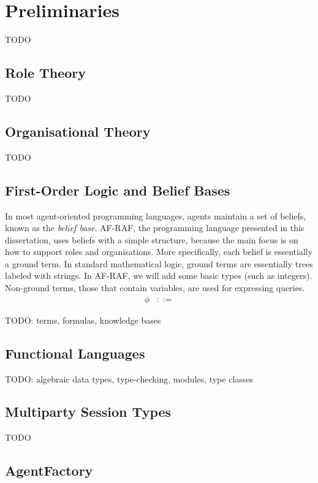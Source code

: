 \documentclass[a4paper,12pt,oneside]{book} %
\theoremstyle{remark}
\theoremstyle{plain}
\begin{document}
\chapter{Preliminaries} %

TODO

\section{Role Theory} %

TODO

\section{Organisational Theory}  %

TODO

\section{First-Order Logic and Belief Bases} %

In most agent-oriented programming languages, agents maintain a set of
beliefs, known as the \emph{belief base}.  AF-RAF, the programming language
presented in this dissertation, uses beliefs with a simple structure,
because the main focus is on how to support roles and organisations.  More
specifically, each belief is essentially a ground term.  In standard
mathematical logic, ground terms are essentially trees labeled with
strings.  In AF-RAF, we will add some basic types (such as integers).
Non-ground terms, those that contain variables, are used for expressing
queries.
\begin{align}
\phi &::= 
\end{align}


TODO: terms, formulas, knowledge bases

\section{Functional Languages} %

TODO: algebraic data types, type-checking, modules, type classes

\section{Multiparty Session Types} %

TODO

\section{AgentFactory} %
\end{document}
